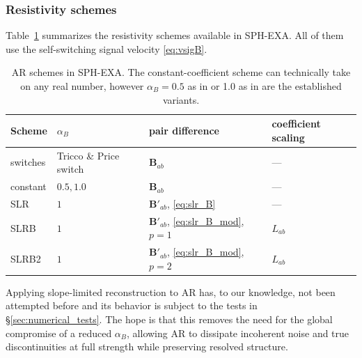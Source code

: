 \subsubsection*{Resistivity schemes}
Table~\ref{tab:ar_schemes} summarizes the resistivity schemes available in SPH-EXA. All of them use the self-switching signal velocity \eqref{eq:vsigB}.

\begin{table}[htbp]
\setlength{\abovecaptionskip}{6pt}%
\centering
\begin{tabular}{@{}ll@{}ll@{}}
\toprule
Scheme & $\alpha_B$ & pair difference & coefficient scaling \\
\midrule
switches & Tricco \& Price switch \; & $\mathbf{B}_{ab}$ & --- \\
constant & $0.5, 1.0$ & $\mathbf{B}_{ab}$                         & --- \\
SLR   & $1$   & $\mathbf{B}'_{ab}$, \eqref{eq:slr_B}       & --- \\
SLRB  & $1$   & $\mathbf{B}'_{ab}$, \eqref{eq:slr_B_mod}, $p=1$ & $L_{ab}$ \\
SLRB2 & $1$   & $\mathbf{B}'_{ab}$, \eqref{eq:slr_B_mod}, $p=2$ & $L_{ab}$ \\
\bottomrule
\end{tabular}
\label{tab:ar_schemes}
\caption{AR schemes in SPH-EXA. The constant-coefficient scheme can technically take on any real number, however $\alpha_B=0.5$ as in \cite{WissingShen2020} or 1.0 as in \cite{Price2018} are the established variants.}
\end{table}

Applying slope-limited reconstruction to AR has, to our knowledge, not been attempted before and its behavior is subject to the tests in §\ref{sec:numerical_tests}. The hope is that this removes the need for the global compromise of a reduced $\alpha_B$, allowing AR to dissipate incoherent noise and true discontinuities at full strength while preserving resolved structure.



